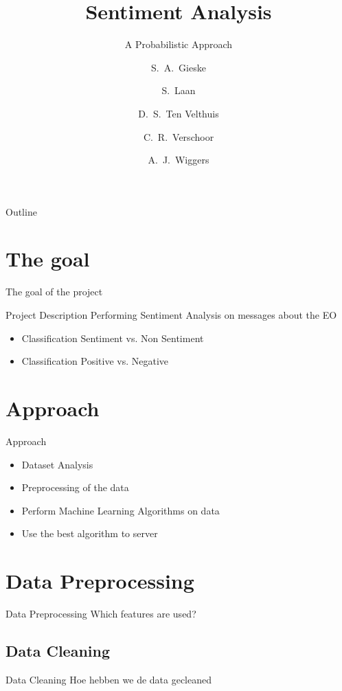 \documentclass{beamer}
\title[Leren en Beslissen - Sentiment Analisys]
{Sentiment Analysis}
\subtitle{A Probabilistic Approach}
\author[Gieske, Laan, ten Velthuis, Verschoor, Wiggers ] %
{S.~A.~Gieske \and S.~Laan \and D.~S.~Ten Velthuis \and C.~R.~Verschoor \and A.~J.~Wiggers}
\institute[University of Amsterdam] %
{
  Faculty of Science (FNWI) \\
  University of Amsterdam
  }
\begin{document}
\begin{frame}
  \titlepage
\end{frame}

\begin{frame}{Outline}
  \setcounter{tocdepth}{1}
  \tableofcontents
\end{frame}


\section{The goal}

\begin{frame}{The goal of the project}
\begin{block}{Project Description}
Performing Sentiment Analysis on messages about the EO
\end{block}
\begin{itemize}
\item Classification Sentiment vs. Non Sentiment
\item Classification Positive vs. Negative
\end{itemize}
\end{frame}

\section{Approach}
\begin{frame}{Approach}
\begin{itemize}
\item Dataset Analysis
\item Preprocessing of the data
\item Perform Machine Learning Algorithms on data
\item Use the best algorithm to server
\end{itemize}
\end{frame}

\section{Data Preprocessing}
\begin{frame}{Data Preprocessing}
Which features are used?
\end{frame}
\subsection{Data Cleaning}
\begin{frame}{Data Cleaning}
Hoe hebben we de data gecleaned
\end{frame}
\end{document}
